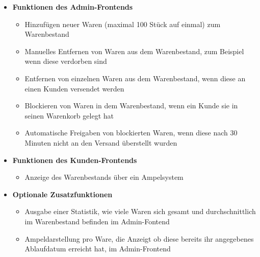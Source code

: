 \begin{itemize}
	\item \textbf{Funktionen des Admin-Frontends}
	\begin{itemize}
		\item Hinzufügen neuer Waren (maximal 100 Stück auf einmal) zum Warenbestand
		\item Manuelles Entfernen von Waren aus dem Warenbestand, zum Beispiel wenn diese verdorben sind
		\item Entfernen von einzelnen Waren aus dem Warenbestand, wenn diese an einen Kunden versendet werden
		\item Blockieren von Waren in dem Warenbestand, wenn ein Kunde sie in seinen Warenkorb gelegt hat
		\item Automatische Freigaben von blockierten Waren, wenn diese nach 30 Minuten nicht an den Versand überstellt wurden
	\end{itemize}
	\item \textbf{Funktionen des Kunden-Frontends}
	\begin{itemize}
		\item Anzeige des Warenbestands über ein Ampelsystem
	\end{itemize}
	\item \textbf{Optionale Zusatzfunktionen}
	\begin{itemize}
		\item Ausgabe einer Statistik, wie viele Waren sich gesamt und durchschnittlich im Warenbestand befinden im Admin-Fontend
		\item Ampeldarstellung pro Ware, die Anzeigt ob diese bereits ihr angegebenes Ablaufdatum erreicht hat, im Admin-Frontend
	\end{itemize}
\end{itemize}
